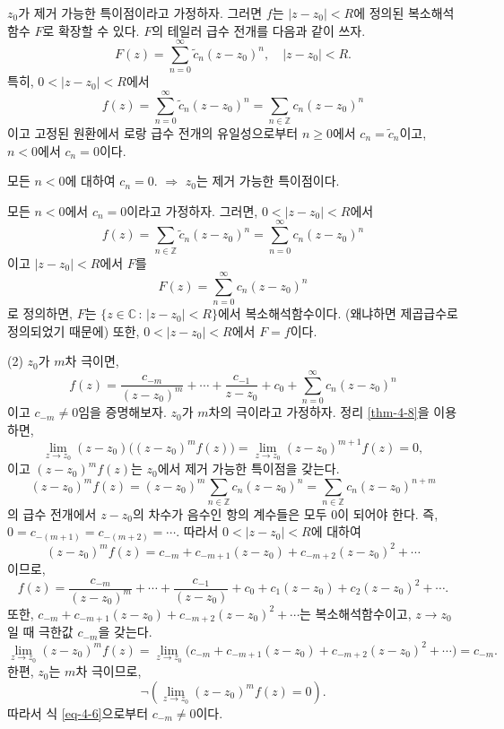 $z_0$가 제거 가능한 특이점이라고 가정하자.
그러면 $f$는 $|z-z_0|<R$에 정의된 복소해석함수 $F$로 확장할 수 있다.
$F$의 테일러 급수 전개를 다음과 같이 쓰자.
\[
F(z) = \sum_{n=0}^\infty  \tilde c_n (z-z_0)^n,\quad
|z-z_0| <R.
\]
특히, $0<|z-z_0| <R$에서
\[
f(z) = \sum_{n=0}^\infty  \tilde c_n (z-z_0)^n 
= \sum_{n\in\mathbb Z} c_n(z-z_0)^n
\]
이고 고정된 원환에서 로랑 급수 전개의 유일성으로부터
$n\ge0$에서 $c_n = \tilde c_n$이고,
$n<0$에서 $c_n=0$이다.

\begin{tcolorbox}[tcbox raise base, nobeforeafter, hbox, colback=white]
모든 $n<0$에 대하여 $c_n=0$.
$\Rightarrow$ $z_0$는 제거 가능한 특이점이다.
\end{tcolorbox}

모든 $n<0$에서 $c_n=0$이라고 가정하자. 그러면,
$0<|z-z_0|<R$에서
\[
f(z) = \sum_{n\in\mathbb Z} \tilde c_n (z-z_0)^n
= \sum_{n=0}^\infty  c_n (z-z_0)^n
\]
이고 $|z-z_0|<R$에서 $F$를
\[
F(z) = \sum_{n=0}^\infty  c_n (z-z_0)^n
\]
로 정의하면, $F$는 
$\{ z\in\mathbb C\,:\, |z-z_0|<R\}$에서 복소해석함수이다.
(왜냐하면 제곱급수로 정의되었기 때문에)
또한, $0<|z-z_0|<R$에서 $F=f$이다.

(2) $z_0$가 $m$차 극이면,
\[
f(z) = \dfrac{c_{-m}}{(z-z_0)^m} + \cdots + \dfrac{c_{-1}}{z-z_0}
+ c_0 + \sum_{n=0}^\infty c_n(z-z_0)^n
\]
이고 $c_{-m} \ne 0$임을 증명해보자.
$z_0$가 $m$차의 극이라고 가정하자.
정리 \ref{thm-4-8}을 이용하면,
\[
\lim_{z\to z_0} (z-z_0)\Big( (z-z_0)^m f(z) \Big)
= \lim_{z\to z_0} (z-z_0)^{m+1} f(z) =0,
\]
이고 $(z-z_0)^m f(z)$는 $z_0$에서 제거 가능한 특이점을 갖는다.
\[
(z-z_0)^mf(z) = (z-z_0)^m \sum_{n\in\mathbb Z}c_n(z-z_0)^n
= \sum_{n\in\mathbb Z}c_n(z-z_0)^{n+m}
\]
의 급수 전개에서 $z-z_0$의 차수가 음수인 항의 계수들은 모두 $0$이 되어야 한다.
즉, $0 = c_{-(m+1)} = c_{-(m+2)} = \cdots$.
따라서 $0<|z-z_0|<R$에 대하여
\begin{equation}\label{eq-4-6}
(z-z_0)^mf(z) = c_{-m} + c_{-m+1}(z-z_0) + c_{-m+2}(z-z_0)^2 + \cdots
\end{equation}
이므로,
\[
f(z) = \dfrac{c_{-m}}{(z-z_0)^m} + \cdots + \dfrac{c_{-1}}{(z-z_0)}
+ c_0 + c_1(z-z_0) + c_2(z-z_0)^2 + \cdots.
\]
또한, 
$c_{-m} + c_{-m+1}(z-z_0) + c_{-m+2}(z-z_0)^2 + \cdots$는 
복소해석함수이고, $z\to z_0$일 때 극한값 $c_{-m}$을 갖는다.
\[
\lim_{z\to z_0} (z-z_0)^mf(z) 
= \lim_{z\to z_0}  \Big( 
c_{-m} + c_{-m+1}(z-z_0) + c_{-m+2}(z-z_0)^2 + \cdots \Big) = c_{-m}.
\]
한편, $z_0$는 $m$차 극이므로, 
\[
\neg \left( \lim_{z\to z_0} (z-z_0)^mf(z) =0 \right).
\]
따라서 식 \eqref{eq-4-6}으로부터 $c_{-m} \ne 0$이다.

